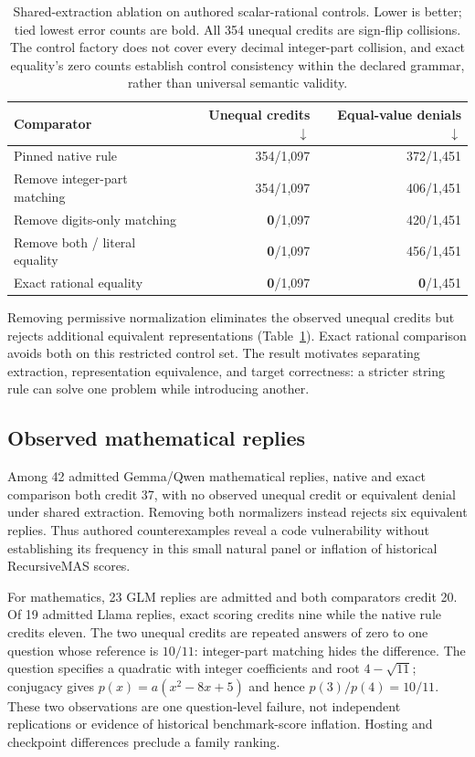 \begin{table}[!ht]
\centering\small
\begin{tabular}{@{}lrr@{}}
\toprule
Comparator & Unequal credits $\downarrow$ & Equal-value denials $\downarrow$\\
\midrule
Pinned native rule & 354/1,097 & 372/1,451\\
Remove integer-part matching & 354/1,097 & 406/1,451\\
Remove digits-only matching & \textbf{0}/1,097 & 420/1,451\\
Remove both / literal equality & \textbf{0}/1,097 & 456/1,451\\
Exact rational equality & \textbf{0}/1,097 & \textbf{0}/1,451\\
\bottomrule
\end{tabular}
\caption{Shared-extraction ablation on authored scalar-rational controls. Lower is better; tied lowest error counts are bold. All 354 unequal credits are sign-flip collisions. The control factory does not cover every decimal integer-part collision, and exact equality's zero counts establish control consistency within the declared grammar, rather than universal semantic validity.}
\label{tab:normalization-ablation}
\end{table}
\FloatBarrier

Removing permissive normalization eliminates the observed unequal credits but rejects additional equivalent representations (Table~\ref{tab:normalization-ablation}). Exact rational comparison avoids both on this restricted control set. The result motivates separating extraction, representation equivalence, and target correctness: a stricter string rule can solve one problem while introducing another.


\subsection{Observed mathematical replies}
Among 42 admitted Gemma/Qwen mathematical replies, native and exact comparison both credit 37, with no observed unequal credit or equivalent denial under shared extraction. Removing both normalizers instead rejects six equivalent replies. Thus authored counterexamples reveal a code vulnerability without establishing its frequency in this small natural panel or inflation of historical RecursiveMAS scores.

For mathematics, 23 GLM replies are admitted and both comparators credit 20. Of 19 admitted Llama replies, exact scoring credits nine while the native rule credits eleven. The two unequal credits are repeated answers of zero to one question whose reference is $10/11$: integer-part matching hides the difference. The question specifies a quadratic with integer coefficients and root $4-\sqrt{11}$; conjugacy gives $p(x)=a(x^2-8x+5)$ and hence $p(3)/p(4)=10/11$. These two observations are one question-level failure, not independent replications or evidence of historical benchmark-score inflation. Hosting and checkpoint differences preclude a family ranking.

